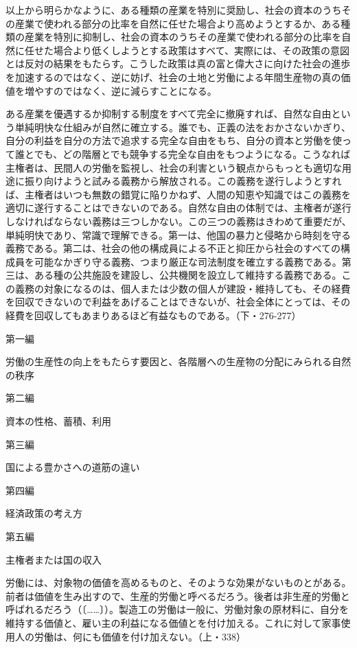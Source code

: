 以上から明らかなように、ある種類の産業を特別に奨励し、社会の資本のうちその産業で使われる部分の比率を自然に任せた場合より高めようとするか、ある種類の産業を特別に抑制し、社会の資本のうちその産業で使われる部分の比率を自然に任せた場合より低くしようとする政策はすべて、実際には、その政策の意図とは反対の結果をもたらす。こうした政策は真の富と偉大さに向けた社会の進歩を加速するのではなく、逆に妨げ、社会の土地と労働による年間生産物の真の価値を増やすのではなく、逆に減らすことになる。

ある産業を優遇するか抑制する制度をすべて完全に撤廃すれば、自然な自由という単純明快な仕組みが自然に確立する。誰でも、正義の法をおかさないかぎり、自分の利益を自分の方法で追求する完全な自由をもち、自分の資本と労働を使って誰とでも、どの階層とでも競争する完全な自由をもつようになる。こうなれば主権者は、民間人の労働を監視し、社会の利害という観点からもっとも適切な用途に振り向けようと試みる義務から解放される。この義務を遂行しようとすれば、主権者はいつも無数の錯覚に陥りかねず、人間の知恵や知識ではこの義務を適切に遂行することはできないのである。自然な自由の体制では、主権者が遂行しなければならない義務は三つしかない。この三つの義務はきわめて重要だが、単純明快であり、常識で理解できる。第一は、他国の暴力と侵略から時刻を守る義務である。第二は、社会の他の構成員による不正と抑圧から社会のすべての構成員を可能なかぎり守る義務、つまり厳正な司法制度を確立する義務である。第三は、ある種の公共施設を建設し、公共機関を設立して維持する義務である。この義務の対象になるのは、個人または少数の個人が建設・維持しても、その経費を回収できないので利益をあげることはできないが、社会全体にとっては、その経費を回収してもあまりあるほど有益なものである。（下・276-277）


第一編

労働の生産性の向上をもたらす要因と、各階層への生産物の分配にみられる自然の秩序

第二編

資本の性格、蓄積、利用

第三編

国による豊かさへの道筋の違い

第四編

経済政策の考え方

第五編

主権者または国の収入


労働には、対象物の価値を高めるものと、そのような効果がないものとがある。前者は価値を生み出すので、生産的労働と呼べるだろう。後者は非生産的労働と呼ばれるだろう（〔……〕）。製造工の労働は一般に、労働対象の原材料に、自分を維持する価値と、雇い主の利益になる価値とを付け加える。これに対して家事使用人の労働は、何にも価値を付け加えない。（上・338）


